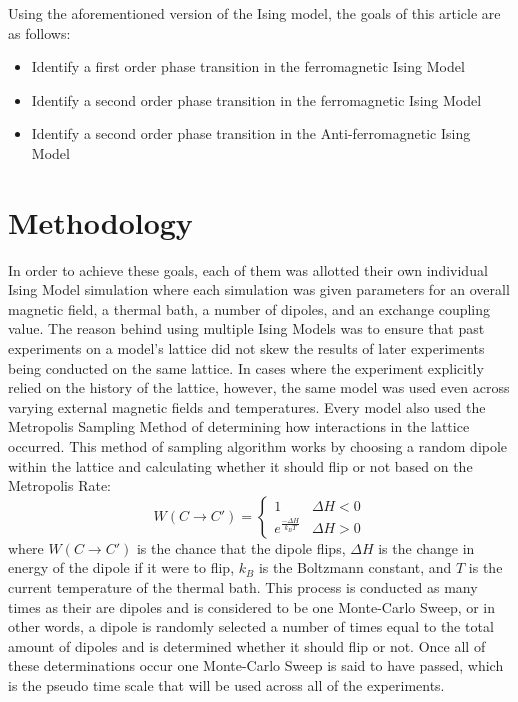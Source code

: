 \documentclass[twocolumn]{article}
\begin{document}
Using the aforementioned version of the Ising model, the goals of this article are as follows:
\begin{itemize}
  \item Identify a first order phase transition in the ferromagnetic Ising Model
  \item Identify a second order phase transition in the ferromagnetic Ising Model
  \item Identify a second order phase transition in the Anti-ferromagnetic Ising Model
\end{itemize}
\section{Methodology}
\hspace{\parindent}In order to achieve these goals, each of them was allotted their own individual Ising Model simulation where each simulation was given parameters for an overall magnetic field, a thermal bath, a number of dipoles, and an exchange coupling value. The reason behind using multiple Ising Models was to ensure that past experiments on a model's lattice did not skew the results of later experiments being conducted on the same lattice. In cases where the experiment explicitly relied on the history of the lattice, however, the same model was used even across varying external magnetic fields and temperatures. Every model also used the Metropolis Sampling Method of determining how interactions in the lattice occurred. This method of sampling algorithm works by choosing a random dipole within the lattice and calculating whether it should flip or not based on the Metropolis Rate:
\begin{equation*}
    W\left(C \rightarrow C'\right) = 
    	\begin{cases}
        	1               & \Delta H < 0\\
        	e^{\frac{-\Delta H}{k_BT}} & \Delta H > 0      
        \end{cases}
\end{equation*}
where $W\left(C \rightarrow C'\right)$ is the chance that the dipole flips, $\Delta H$ is the change in energy of the dipole if it were to flip, $k_B$ is the Boltzmann constant, and $T$ is the current temperature of the thermal bath. This process is conducted as many times as their are dipoles and is considered to be one Monte-Carlo Sweep, or in other words, a dipole is randomly selected a number of times equal to the total amount of dipoles and is determined whether it should flip or not. Once all of these determinations occur one Monte-Carlo Sweep is said to have passed, which is the pseudo time scale that will be used across all of the experiments.
\end{document}
